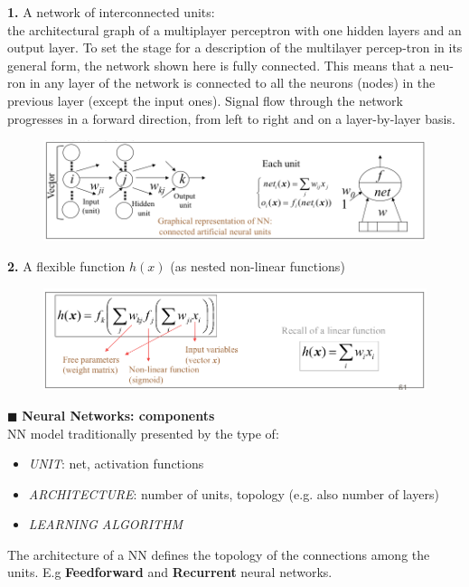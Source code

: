 \documentclass[../main.tex]{subfiles}
\begin{document}
\textbf{1.} A network of interconnected units:\\
 the architectural graph of a multiplayer perceptron with one hidden layers and an output layer. To set the stage for a description of the multilayer percep-tron in its general form, the network shown here is fully connected. This means that a neu-ron in any layer of the network is connected to all the neurons (nodes) in the previous layer (except the input ones). Signal flow through the network progresses in a forward direction, from left to right and on a layer-by-layer basis.
\begin{figure}[H]
    \centering
    \includegraphics[scale = 0.4]{lectures/4_neural_networks/4_network_of_units.png}
\end{figure}
\textbf{2.} A flexible function $h(x)$ (as nested non-linear functions)
\begin{figure}[H]
    \centering
    \includegraphics[scale = 0.4]{lectures/4_neural_networks/4_flexible_function.png}
\end{figure}

\noindent$\blacksquare$ \textbf{Neural Networks: components}\\
NN model traditionally presented by the type of:
\begin{itemize}
    \item \textit{UNIT}: net, activation functions
    \item \textit{ARCHITECTURE}: number of units, topology (e.g. also number of layers)
    \item \textit{LEARNING ALGORITHM}
\end{itemize}

The architecture of a NN defines the topology of the connections among the units. E.g \textbf{Feedforward} and \textbf{Recurrent} neural networks.
\end{document}
